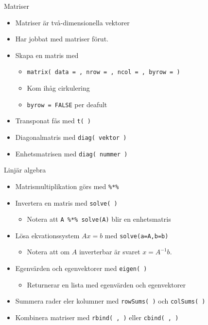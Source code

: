 \documentclass[
  11pt,
  ignorenonframetext,
  handout]{beamer}
\providecommand{\tightlist}{%
  \setlength{\itemsep}{0pt}\setlength{\parskip}{0pt}}
\begin{document}
\begin{frame}{Matriser}
\protect\hypertarget{matriser}{}
\begin{itemize}
\tightlist
\item
  Matriser är två-dimensionella vektorer
\item
  Har jobbat med matriser förut.
\item
  Skapa en matris med

  \begin{itemize}
  \tightlist
  \item
    \texttt{matrix( data = , nrow = , ncol = , byrow = )}
  \item
    Kom ihåg cirkulering
  \item
    \texttt{byrow = FALSE} per deafult
  \end{itemize}
\item
  Transponat fås med \texttt{t( )}
\item
  Diagonalmatris med \texttt{diag( vektor )}
\item
  Enhetsmatrisen med \texttt{diag( nummer )}
\end{itemize}
\end{frame}

\begin{frame}{Linjär algebra}
\protect\hypertarget{linjuxe4r-algebra-1}{}
\begin{itemize}
\tightlist
\item
  Matrismultiplikation görs med \texttt{\%*\%}
\item
  Invertera en matris med \texttt{solve( )}

  \begin{itemize}
  \tightlist
  \item
    Notera att \texttt{A \%*\% solve(A)} blir en enhetsmatris
  \end{itemize}
\item
  Lösa ekvationssystem \(Ax = b\) med \texttt{solve(a=A,b=b)}

  \begin{itemize}
  \tightlist
  \item
    Notera att om \(A\) inverterbar är svaret \(x = A^{-1}b\).
  \end{itemize}
\item
  Egenvärden och egenvektorer med \texttt{eigen( )}

  \begin{itemize}
  \tightlist
  \item
    Returnerar en lista med egenvärden och egenvektorer
  \end{itemize}
\item
  Summera rader eler kolumner med \texttt{rowSums( )} och
  \texttt{colSums( )}
\item
  Kombinera matriser med \texttt{rbind( , )} eller \texttt{cbind( , )}
\end{itemize}
\end{frame}
\end{document}
